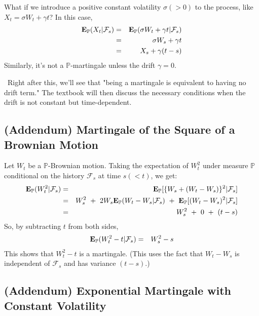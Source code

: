 \documentclass[uplatex,a4j,12pt,dvipdfmx]{jsarticle}
\begin{document}
What if we introduce a positive constant volatility $\sigma(>0)$ to the process, like $X_{t} = \sigma W_{t} + \gamma t$?
In this case,
%
\begin{eqnarray*}
	{\bf E}_{\mathbb{P}}( X_{t} | \mathcal{F}_{s} )
	&=&
	{\bf E}_{\mathbb{P}}( \sigma W_{t} + \gamma t | \mathcal{F}_{s} )
	\\ &=&
	\sigma W_{s}+ \gamma t
	\\ &=&
	X_{s} + \gamma ( t - s )
\end{eqnarray*}
%
Similarly, it's not a $\mathbb{P}$-martingale unless the drift $\gamma = 0$.

\
Right after this, we'll see that "being a martingale is equivalent to having no drift term." The textbook will then discuss the necessary conditions when the drift is not constant but time-dependent.
\subsection{(Addendum) Martingale of the Square of a Brownian Motion}
Let $W_{t}$ be a $\mathbb{P}$-Brownian motion. Taking the expectation of $W_{t}^{2}$ under measure $\mathbb{P}$ conditional on the history $\mathcal{F}_{s}$ at time $s(<t)$, we get:
%
\begin{eqnarray*}
	{\bf E}_{\mathbb{P}}( W_{t}^{2} | \mathcal{F}_{s} )
	&=&
	{\bf E}_{\mathbb{P}}[ \{ W_{s} + (W_{t} - W_{s}) \}^{2} | \mathcal{F}_{s} ]
	\\ &=&
	W_{s}^{2}
	\ + \
	2 W_{s}
		{\bf E}_{\mathbb{P}}( W_{t} - W_{s} | \mathcal{F}_{s} )
	\ + \
	{\bf E}_{\mathbb{P}}[ ( W_{t} - W_{s} )^{2} | \mathcal{F}_{s} ]
	\\ &=&
	W_{s}^{2}
	\ + \
	0
	\ + \
	(t-s)
\end{eqnarray*}
%
So, by subtracting $t$ from both sides,
%
\begin{eqnarray*}
	{\bf E}_{\mathbb{P}}( W_{t}^{2} - t | \mathcal{F}_{s} )
	&=&
	W_{s}^{2} - s
\end{eqnarray*}
%
This shows that $W_{t}^{2} - t$ is a martingale. (This uses the fact that $W_{t} - W_{s}$ is independent of $\mathcal{F}_{s}$ and has variance $(t-s)$.)

\subsection{(Addendum) Exponential Martingale with Constant Volatility}
\end{document}
